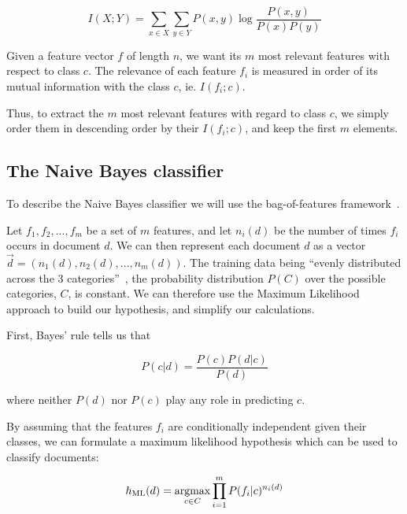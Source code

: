\begin{equation}
  I(X; Y) = \sum_{x \in X} \sum_{y \in Y} P(x, y) \log \frac{P(x, y)}{P(x) P(y)}
  \label{eq:mutual_information}
\end{equation}

Given a feature vector $f$ of length $n$, we want its $m$ most relevant features with respect to class $c$. The relevance of each feature $f_i$ is measured in order of its mutual information with the class $c$, ie. $I(f_i; c)$.

Thus, to extract the $m$ most relevant features with regard to class $c$, we simply order them in descending order by their $I(f_i; c)$, and keep the first $m$ elements.


\subsection{The Naive Bayes classifier}
\label{ssec:nb_classifier}

To describe the Naive Bayes classifier we will use the bag-of-features framework~\cite{pang2002thumbs}.

Let ${f_1, f_2, ..., f_m}$ be a set of $m$ features, and let $n_i(d)$ be the number of times $f_i$ occurs in document $d$. We can then represent each document $d$ as a vector $\vec{d} = (n_1(d), n_2(d), ..., n_m(d))$. The training data being ``evenly distributed across the 3 categories''~\cite{DatumBoxTwitterSentiment}, the probability distribution $P(C)$ over the possible categories, $C$, is constant. We can therefore use the Maximum Likelihood approach to build our hypothesis, and simplify our calculations.

First, Bayes' rule tells us that

\begin{equation}
  P(c | d) = \frac{P(c) P(d | c)}{P(d)}
\end{equation}

where neither $P(d)$ nor $P(c)$ play any role in predicting $c$.

By assuming that the features $f_i$ are conditionally independent given their classes, we can formulate a maximum likelihood hypothesis which can be used to classify documents:

\begin{equation}
  h_{\text{ML}}(d) = \argmax_{c \in C} \prod_{i=1}^m P(f_i | c)^{n_i(d)}
\end{equation}

